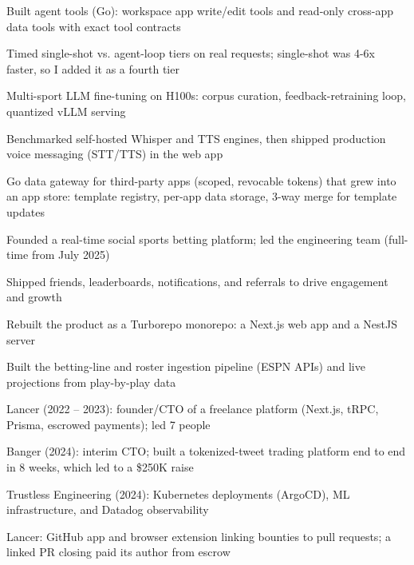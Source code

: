 \documentclass[print]{jack-resume}
\begin{document}
\begin{tightemize}
    \item Built agent tools (Go): workspace app write/edit tools and read-only cross-app data tools with exact tool contracts
    \item Timed single-shot vs. agent-loop tiers on real requests; single-shot was 4-6x faster, so I added it as a fourth tier
    \item Multi-sport LLM fine-tuning on H100s: corpus curation, feedback-retraining loop, quantized vLLM serving
    \item Benchmarked self-hosted Whisper and TTS engines, then shipped production voice messaging (STT/TTS) in the web app
    \item Go data gateway for third-party apps (scoped, revocable tokens) that grew into an app store: template registry, per-app data storage, 3-way merge for template updates
\end{tightemize}
\sectionsep

\begin{tightemize}
    \item Founded a real-time social sports betting platform; led the engineering team (full-time from July 2025)
    \item Shipped friends, leaderboards, notifications, and referrals to drive engagement and growth
    \item Rebuilt the product as a Turborepo monorepo: a Next.js web app and a NestJS server
    \item Built the betting-line and roster ingestion pipeline (ESPN APIs) and live projections from play-by-play data
\end{tightemize}
\sectionsep

\begin{tightemize}
    \item Lancer (2022 -- 2023): founder/CTO of a freelance platform (Next.js, tRPC, Prisma, escrowed payments); led 7 people
    \item Banger (2024): interim CTO; built a tokenized-tweet trading platform end to end in 8 weeks, which led to a \$250K raise
    \item Trustless Engineering (2024): Kubernetes deployments (ArgoCD), ML infrastructure, and Datadog observability
    \item Lancer: GitHub app and browser extension linking bounties to pull requests; a linked PR closing paid its author from escrow
\end{tightemize}
\sectionsep
\end{document}
